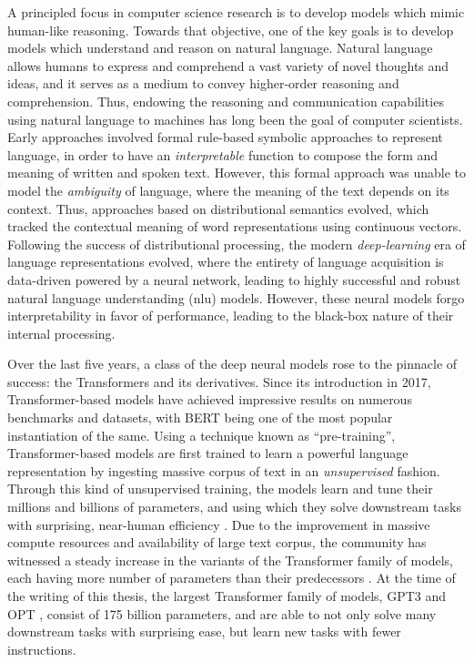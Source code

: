 \documentclass[letterpaper, 12pt]{report}
\begin{document}
A principled focus in computer science research is to develop models which mimic human-like reasoning. Towards that objective, one of the key goals is to develop models which understand and reason on natural language. Natural language allows humans to express and comprehend a vast variety of novel thoughts and ideas, and it serves as a medium to convey higher-order reasoning and comprehension. Thus, endowing the reasoning and communication capabilities using natural language to machines has long been the goal of computer scientists. Early approaches involved formal rule-based symbolic approaches to represent language, in order to have an \textit{interpretable} function to compose the form and meaning of written and spoken text. However, this formal approach was unable to model the \textit{ambiguity} of language, where the meaning of the text depends on its context. Thus, approaches based on distributional semantics evolved, which tracked the contextual meaning of word representations using continuous vectors. Following the success of distributional processing, the modern \textit{deep-learning} era of language representations evolved, where the entirety of language acquisition is data-driven powered by a neural network, leading to highly successful and robust natural language understanding (\acrshort{nlu}) models. However, these neural models forgo interpretability in favor of performance, leading to the black-box nature of their internal processing.


Over the last five years, a class of the deep neural models rose to the pinnacle of success: the Transformers \citep{vaswani-etal-2017-attention} and its derivatives. Since its introduction in 2017, Transformer-based models have achieved impressive results on numerous benchmarks and datasets, with BERT \citep{devlin2018bert} being one of the most popular instantiation of the same. Using a technique known as ``pre-training'', Transformer-based models are first trained to learn a powerful language representation by ingesting massive corpus of text in an \textit{unsupervised} fashion. Through this kind of unsupervised training, the models learn and tune their millions and billions of parameters, and using which they solve downstream tasks with surprising, near-human efficiency \citep{devlin2018bert,liu-et-al-2019-roberta,lewis-etal-2020-bart}. Due to the improvement in massive compute resources and availability of large text corpus, the community has witnessed a steady increase in the variants of the Transformer family of models, each having more number of parameters than their predecessors \citep{kaplan2020scaling}. At the time of the writing of this thesis, the largest Transformer family of models, GPT3 \citep{Brown2020:GPT3} and OPT \citep{Zhang2022:OPT}, consist of 175 billion parameters, and are able to not only solve many downstream tasks with surprising ease, but learn new tasks with fewer instructions.
\end{document}
